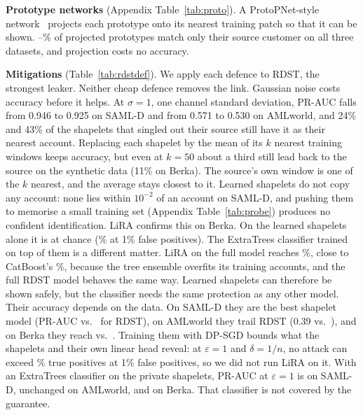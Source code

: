 \documentclass[sigconf,anonymous]{acmart}
\begin{document}
\textbf{Prototype networks} (Appendix Table~\ref{tab:proto}). A ProtoPNet-style network~\cite{chen2019} projects each prototype onto its nearest training patch so that it can be shown. \protoReidMin--\protoReidMax\% of projected prototypes match only their source customer on all three datasets, and projection costs no accuracy.



\textbf{Mitigations} (Table~\ref{tab:rdstdef}). We apply each defence to RDST, the strongest leaker. Neither cheap defence removes the link. Gaussian noise costs accuracy before it helps. At $\sigma{=}1$, one channel standard deviation, PR-AUC falls from 0.946 to 0.925 on SAML-D and from 0.571 to 0.530 on AMLworld, and 24\% and 43\% of the shapelets that singled out their source still have it as their nearest account. Replacing each shapelet by the mean of its $k$ nearest training windows keeps accuracy, but even at $k{=}50$ about a third still lead back to the source on the synthetic data (11\% on Berka). The source's own window is one of the $k$ nearest, and the average stays closest to it. Learned shapelets do not copy any account: none lies within $10^{-2}$ of an account on SAML-D, and pushing them to memorise a small training set (Appendix Table~\ref{tab:probe}) produces no confident identification. LiRA confirms this on Berka. On the learned shapelets alone it is at chance (\liraLearnShpTpr\% at 1\% false positives). The ExtraTrees classifier trained on top of them is a different matter. LiRA on the full model reaches \liraLearnFullTpr\%, close to CatBoost's \liraCbFullTpr\%, because the tree ensemble overfits its training accounts, and the full RDST model behaves the same way. Learned shapelets can therefore be shown safely, but the classifier needs the same protection as any other model. Their accuracy depends on the data. On SAML-D they are the best shapelet model (PR-AUC \learnPR{} vs.\ \rdstPR{} for RDST), on AMLworld they trail RDST (0.39 vs.\ \amlRdstPR), and on Berka they reach \berkaLearnPR{} vs.\ \berkaRdstPR. Training them with DP-SGD bounds what the shapelets and their own linear head reveal: at $\varepsilon{=}1$ and $\delta{=}1/n$, no attack can exceed \dpBound\% true positives at 1\% false positives, so we did not run LiRA on it. With an ExtraTrees classifier on the private shapelets, PR-AUC at $\varepsilon{=}1$ is \dpSamldOne{} on SAML-D, unchanged on AMLworld, and \dpBerkaOne{} on Berka. That classifier is not covered by the guarantee.
\end{document}
